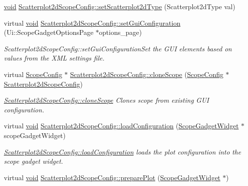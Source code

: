 \begin{DoxyCompactItemize}
\item 
\hyperlink{group___u_a_v_objects_plugin_ga444cf2ff3f0ecbe028adce838d373f5c}{void} \hyperlink{group___scope_plugin_ga67790b6de2598e4ff9f2d585fee11d09}{Scatterplot2d\-Scope\-Config\-::set\-Scatterplot2d\-Type} (Scatterplot2d\-Type val)
\item 
virtual \hyperlink{group___u_a_v_objects_plugin_ga444cf2ff3f0ecbe028adce838d373f5c}{void} \hyperlink{group___scope_plugin_gafe1bd9bbdc9859af7a5d0ad561172a16}{Scatterplot2d\-Scope\-Config\-::set\-Gui\-Configuration} (Ui\-::\-Scope\-Gadget\-Options\-Page $\ast$options\-\_\-page)
\begin{DoxyCompactList}\small\item\em Scatterplot2d\-Scope\-Config\-::set\-Gui\-Configuration\-Set the G\-U\-I elements based on values from the X\-M\-L settings file. \end{DoxyCompactList}\item 
virtual \hyperlink{class_scope_config}{Scope\-Config} $\ast$ \hyperlink{group___scope_plugin_ga71ae0bb572870f67432575772c3093f8}{Scatterplot2d\-Scope\-Config\-::clone\-Scope} (\hyperlink{class_scope_config}{Scope\-Config} $\ast$\hyperlink{class_scatterplot2d_scope_config}{Scatterplot2d\-Scope\-Config})
\begin{DoxyCompactList}\small\item\em \hyperlink{group___scope_plugin_ga71ae0bb572870f67432575772c3093f8}{Scatterplot2d\-Scope\-Config\-::clone\-Scope} Clones scope from existing G\-U\-I configuration. \end{DoxyCompactList}\item 
virtual \hyperlink{group___u_a_v_objects_plugin_ga444cf2ff3f0ecbe028adce838d373f5c}{void} \hyperlink{group___scope_plugin_ga33b7752470b6c5d32b9aaf1b95faf0f7}{Scatterplot2d\-Scope\-Config\-::load\-Configuration} (\hyperlink{class_scope_gadget_widget}{Scope\-Gadget\-Widget} $\ast$scope\-Gadget\-Widget)
\begin{DoxyCompactList}\small\item\em \hyperlink{group___scope_plugin_ga33b7752470b6c5d32b9aaf1b95faf0f7}{Scatterplot2d\-Scope\-Config\-::load\-Configuration} loads the plot configuration into the scope gadget widget. \end{DoxyCompactList}\item 
virtual \hyperlink{group___u_a_v_objects_plugin_ga444cf2ff3f0ecbe028adce838d373f5c}{void} \hyperlink{group___scope_plugin_ga7ff8815549e33c472a7ada6080401b38}{Scatterplot2d\-Scope\-Config\-::prepare\-Plot} (\hyperlink{class_scope_gadget_widget}{Scope\-Gadget\-Widget} $\ast$)

\end{DoxyCompactItemize}
